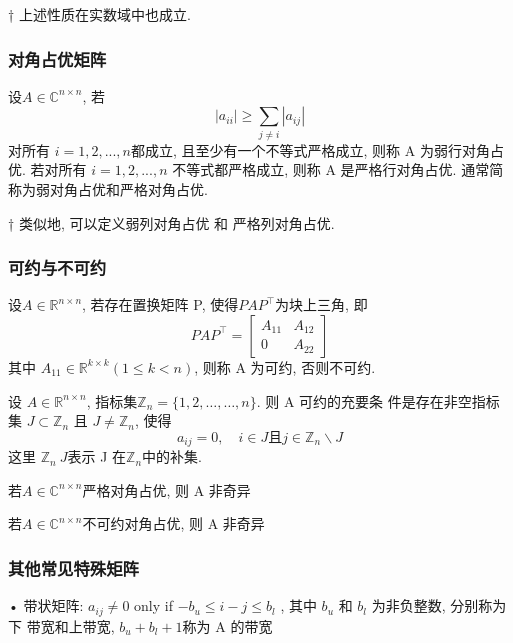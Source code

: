 \documentclass[12pt,a4paper]{article}
\begin{document}
† 上述性质在实数域中也成立.



\subsubsection{对角占优矩阵}

\begin{definition}
	设$ A ∈\mathbb{C}^{n×n}$, 若
	$$
	\left|a_{i i}\right| \geq \sum_{j \neq i}\left|a_{i j}\right|
	$$
	对所有 $i = 1, 2, . . . , n $都成立, 且至少有一个不等式严格成立, 则称 A
	为弱行对角占优. 若对所有 $i = 1, 2, . . . , n$ 不等式都严格成立, 则称 A
	是严格行对角占优. 通常简称为弱对角占优和严格对角占优.	
\end{definition}



† 类似地, 可以定义弱列对角占优 和 严格列对角占优.


\subsubsection{可约与不可约}
设$A \in \mathbb{R}^{n \times n}$, 若存在置换矩阵 P, 使得$P A P^{\top}$为块上三角, 即
$$
P A P^{\top}=\left[\begin{array}{cc}{A_{11}} & {A_{12}} \\ {0} & {A_{22}}\end{array}\right]
$$
其中 $A_{11} \in \mathbb{R}^{k \times k}(1 \leq k<n)$, 则称 A 为可约, 否则不可约.



\begin{theorem}
	设 $A \in \mathbb{R}^{n \times n}$, 指标集$\mathbb{Z}_{n}=\{1,2, \ldots, \ldots, n\}$. 则 A 可约的充要条
	件是存在非空指标集 $J \subset \mathbb{Z}_{n}$ 且 $J \neq \mathbb{Z}_{n}$, 使得
	$$
	a_{i j}=0, \quad i \in J \text{且} j \in \mathbb{Z}_{n} \backslash J
	$$
	这里 $\mathbb{Z}_n \ J $表示 J 在$ \mathbb{Z}_n $中的补集.	
\end{theorem}



\begin{theorem}
	若$A \in \mathbb{C}^{n \times n}$严格对角占优, 则 A 非奇异	
\end{theorem}



\begin{theorem}
	若$A \in \mathbb{C}^{n \times n}$不可约对角占优, 则 A 非奇异	
\end{theorem}


\subsubsection{其他常见特殊矩阵}
• 带状矩阵:
$a_{i j} \neq 0$ only if $-b_{u} \leq i-j \leq b_{l}$
, 其中 $b_u$ 和 $b_l$ 为非负整数, 分别称为下
带宽和上带宽, $b_u + b_l + 1 $称为 A 的带宽
\end{document}
